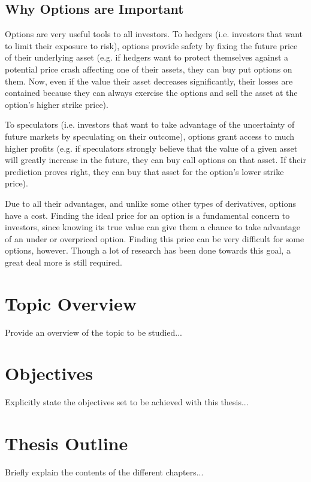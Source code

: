 \subsection{Why Options are Important}
\label{subsection:why options are important}
Options are very useful tools to all investors. 
To hedgers (i.e. investors that want to limit their exposure to risk), options provide safety by fixing the future price of their underlying asset (e.g. if hedgers want to protect themselves against a potential price crash affecting one of their assets, they can buy put options on them. Now, even if the value their asset decreases significantly, their losses are contained because they can always exercise the options and sell the asset at the option's higher strike price).

To speculators (i.e. investors that want to take advantage of the uncertainty of future markets by speculating on their outcome), options grant access to much higher profits (e.g. if speculators strongly believe that the value of a given asset will greatly increase in the future, they can buy call options on that asset. If their prediction proves right, they can buy that asset for the option's lower strike price).

Due to all their advantages, and unlike some other types of derivatives, options have a cost. Finding the ideal price for an option is a fundamental concern to investors, since knowing its true value can give them a chance to take advantage of an under or overpriced option.
Finding this price can be very difficult for some options, however. Though a lot of research has been done towards this goal, a great deal more is still required.


\section{Topic Overview}
\label{section:overview}

Provide an overview of the topic to be studied...


\section{Objectives}
\label{section:objectives}

Explicitly state the objectives set to be achieved with this thesis...


\section{Thesis Outline}
\label{section:outline}

Briefly explain the contents of the different chapters...

